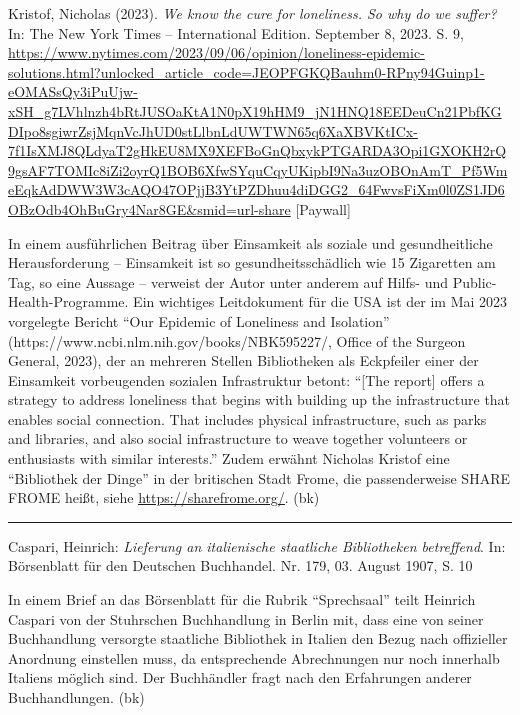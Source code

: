 \documentclass[a4paper,
fontsize=11pt,
oneside,
numbers=noperiodatend,
parskip=half-,
bibliography=totoc,
final
]{scrartcl}
\begin{document}
Kristof, Nicholas (2023). \emph{We know the cure for loneliness. So why
do we suffer?} In: The New York Times -- International Edition.
September 8, 2023. S. 9,
\url{https://www.nytimes.com/2023/09/06/opinion/loneliness-epidemic-solutions.html?unlocked_article_code=JEOPFGKQBauhm0-RPny94Guinp1-eOMASsQy3iPuUjw-xSH_g7LVhlnzh4bRtJUSOaKtA1N0pX19hHM9_jN1HNQ18EEDeuCn21PbfKGDIpo8sgiwrZsjMqnVcJhUD0stLlbnLdUWTWN65q6XaXBVKtICx-7f1IsXMJ8QLdyaT2gHkEU8MX9XEFBoGnQbxykPTGARDA3Opi1GXOKH2rQ9gsAF7TOMIc8iZi2oyrQ1BOB6XfwSYquCqyUKipbI9Na3uzOBOnAmT_Pf5WmeEqkAdDWW3W3cAQO47OPjjB3YtPZDhuu4diDGG2_64FwvsFiXm0l0ZS1JD6OBzOdb4OhBuGry4Nar8GE\&smid=url-share}
{[}Paywall{]}

In einem ausführlichen Beitrag über Einsamkeit als soziale und
gesundheitliche Herausforderung -- Einsamkeit ist so
gesundheitsschädlich wie 15 Zigaretten am Tag, so eine Aussage --
verweist der Autor unter anderem auf Hilfs- und Public-Health-Programme.
Ein wichtiges Leitdokument für die USA ist der im Mai 2023 vorgelegte
Bericht \enquote{Our Epidemic of Loneliness and Isolation} (https://www.ncbi.nlm.nih.gov/books/NBK595227/, Office of
the Surgeon General, 2023), der an mehreren Stellen
Bibliotheken als Eckpfeiler einer der Einsamkeit vorbeugenden sozialen
Infrastruktur betont: \enquote{{[}The report{]} offers a strategy to
address loneliness that begins with building up the infrastructure that
enables social connection. That includes physical infrastructure, such
as parks and libraries, and also social infrastructure to weave together
volunteers or enthusiasts with similar interests.} Zudem erwähnt
Nicholas Kristof eine \enquote{Bibliothek der Dinge} in der britischen
Stadt Frome, die passenderweise SHARE FROME heißt, siehe
\href{https://sharefrome.org/}{\uline{https://sharefrome.org/}}. (bk)

\begin{center}\rule{0.5\linewidth}{0.5pt}\end{center}

Caspari, Heinrich: \emph{Lieferung an italienische staatliche
Bibliotheken betreffend}. In: Börsenblatt für den Deutschen Buchhandel.
Nr. 179, 03. August 1907, S. 10

In einem Brief an das Börsenblatt für die Rubrik \enquote{Sprechsaal}
teilt Heinrich Caspari von der Stuhrschen Buchhandlung in Berlin mit,
dass eine von seiner Buchhandlung versorgte staatliche Bibliothek in
Italien den Bezug nach offizieller Anordnung einstellen muss, da
entsprechende Abrechnungen nur noch innerhalb Italiens möglich sind. Der
Buchhändler fragt nach den Erfahrungen anderer Buchhandlungen. (bk)
\end{document}
